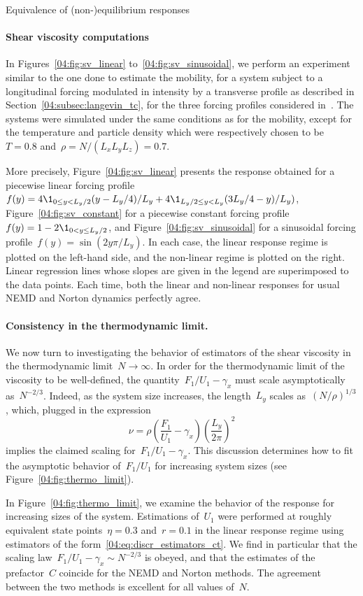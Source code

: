 \begin{subsection}{Equivalence of (non-)equilibrium responses}
    \paragraph{Shear viscosity computations}
    In Figures~\ref{04:fig:sv_linear} to~\ref{04:fig:sv_sinusoidal}, we perform an experiment similar to the one done to estimate the mobility, for a system subject to a longitudinal forcing modulated in intensity by a transverse profile as described in Section~\ref{04:subsec:langevin_tc}, for the three forcing profiles considered in~\cite{JS12}. The systems were simulated under the same conditions as for the mobility, except for the temperature  and particle density which were respectively chosen to be~$T=0.8$ and~$\rho=N/(L_xL_yL_z)=0.7$.

    More precisely, Figure~\ref{04:fig:sv_linear} 
 presents the response obtained for a piecewise linear forcing profile ~$f(y)=4\1_{0\leq y < L_y/2}(y-L_y/4)/L_y + 4\1_{L_y/2\leq y < L_y}(3L_y/4-y)/L_y)$, Figure~\ref{04:fig:sv_constant} for a piecewise constant forcing profile~$f(y)=1-2 \1_{0<y\leq L_y/2}$, and Figure~\ref{04:fig:sv_sinusoidal} for a sinusoidal forcing profile~$f(y)=\sin(2y\pi/L_y)$. In each case, the linear response regime is plotted on the left-hand side, and the non-linear regime is plotted on the right. Linear regression lines whose slopes are given in the legend are superimposed to the data points. Each time, both the linear and non-linear responses for usual NEMD and Norton dynamics perfectly agree.

\paragraph{Consistency in the thermodynamic limit.}
 We now turn to investigating the behavior of estimators of the shear viscosity in the thermodynamic limit~$N\to\infty$.
 In order for the thermodynamic limit of the viscosity to be well-defined, the quantity~$F_1/U_1 -\gamma_x$ must scale asymptotically as~$N^{-2/3}$. Indeed, as the system size increases, the length~$L_y$ scales as~$(N/\rho)^{1/3}$, which, plugged in the expression\[\nu=\rho\left(\frac{F_1}{U_1} - \gamma_x\right)\left(\frac{L_y}{2\pi}\right)^2\]
implies the claimed scaling for~$F_1/U_1 -\gamma_x$. This discussion determines how to fit the asymptotic behavior of~$F_1/U_1$ for increasing system sizes (see Figure~\ref{04:fig:thermo_limit}).

 In Figure~\ref{04:fig:thermo_limit}, we examine the behavior of the response for increasing sizes of the system. Estimations of~$U_1$ were performed at roughly equivalent state points~$\eta = 0.3$ and~$r=0.1$ in the linear response regime using estimators of the form~\eqref{04:eq:discr_estimators_ct}. We find in particular that the scaling law~$F_1/U_1 -\gamma_x \sim N^{-2/3}$ is obeyed, and that the estimates of the prefactor~$C$ coincide for the NEMD and Norton methods. The agreement between the two methods is excellent for all values of~$N$. 


\end{subsection}
